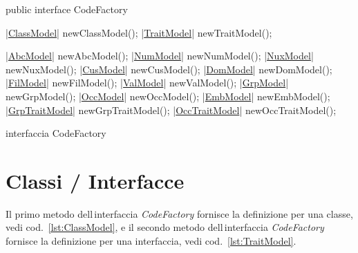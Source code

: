\documentclass[a4paper,10pt]{report}
\newif\ifesource
\newenvironment{elisting}[1][H]
  {\captionsetup{aboveskip=0pt}\begin{listing}[#1]}
  {\end{listing}%
}
\begin{document}
\ifesource
\begin{figure*}[!htb]
\begin{lstlisting}[language=java, caption=interfaccia CodeFactory, 
label=lst:CodeFactory]
public interface CodeFactory {
    (*\hyperref[lst:ClassModel]{ClassModel}*) newClassModel();
    (*\hyperref[lst:TraitModel]{TraitModel}*) newTraitModel();

    (*\hyperref[lst:AbcModel]{AbcModel}*) newAbcModel();
    (*\hyperref[lst:NumModel]{NumModel}*) newNumModel();
    (*\hyperref[lst:NuxModel]{NuxModel}*) newNuxModel();
    (*\hyperref[lst:CusModel]{CusModel}*) newCusModel();
    (*\hyperref[lst:DomModel]{DomModel}*) newDomModel();
    (*\hyperref[lst:FilModel]{FilModel}*) newFilModel();
    (*\hyperref[lst:ValModel]{ValModel}*) newValModel();
    (*\hyperref[lst:GrpModel]{GrpModel}*) newGrpModel();
    (*\hyperref[lst:OccModel]{OccModel}*) newOccModel();
    (*\hyperref[lst:EmbModel]{EmbModel}*) newEmbModel();
    (*\hyperref[lst:GrpTraitModel]{GrpTraitModel}*) newGrpTraitModel();
    (*\hyperref[lst:OccTraitModel]{OccTraitModel}*) newOccTraitModel();
}
\end{lstlisting}\index{CodeFactory}
\end{figure*}
\else
\begin{elisting}[!htb]
\begin{javacode}
public interface CodeFactory {
    |\hyperref[lst:ClassModel]{ClassModel}| newClassModel();
    |\hyperref[lst:TraitModel]{TraitModel}| newTraitModel();

    |\hyperref[lst:AbcModel]{AbcModel}| newAbcModel();
    |\hyperref[lst:NumModel]{NumModel}| newNumModel();
    |\hyperref[lst:NuxModel]{NuxModel}| newNuxModel();
    |\hyperref[lst:CusModel]{CusModel}| newCusModel();
    |\hyperref[lst:DomModel]{DomModel}| newDomModel();
    |\hyperref[lst:FilModel]{FilModel}| newFilModel();
    |\hyperref[lst:ValModel]{ValModel}| newValModel();
    |\hyperref[lst:GrpModel]{GrpModel}| newGrpModel();
    |\hyperref[lst:OccModel]{OccModel}| newOccModel();
    |\hyperref[lst:EmbModel]{EmbModel}| newEmbModel();
    |\hyperref[lst:GrpTraitModel]{GrpTraitModel}| newGrpTraitModel();
    |\hyperref[lst:OccTraitModel]{OccTraitModel}| newOccTraitModel();
}
\end{javacode}
\caption{interfaccia CodeFactory}
\label{lst:CodeFactory}
\end{elisting}
\fi

\section{Classi / Interfacce}
Il primo metodo dell\,interfaccia \textsl{CodeFactory} fornisce la definizione 
per una classe, vedi cod.~\ref{lst:ClassModel}, e il secondo metodo 
dell\,interfaccia \textsl{CodeFactory} fornisce la definizione per una 
interfaccia, vedi cod.~\ref{lst:TraitModel}.
\end{document}
